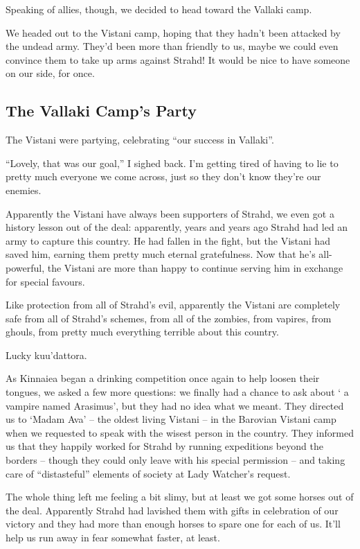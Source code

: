 Speaking of allies, though, we decided to head toward the Vallaki camp.

We headed out to the Vistani camp, hoping that they hadn't been attacked by the undead army. They'd been more than friendly to us, maybe we could even convince them to take up arms against Strahd! It would be nice to have someone on our side, for once.

\subsection*{The Vallaki Camp's Party}
The Vistani were partying, celebrating ``our success in Vallaki''.

``Lovely, that was our goal,'' I sighed back. I'm getting tired of having to lie to pretty much everyone we come across, just so they don't know they're our enemies.

Apparently the Vistani have always been supporters of Strahd, we even got a history lesson out of the deal: apparently, years and years ago Strahd had led an army to capture this country. He had fallen in the fight, but the Vistani had saved him, earning them pretty much eternal gratefulness. Now that he's all-powerful, the Vistani are more than happy to continue serving him in exchange for special favours.

Like protection from all of Strahd's evil, apparently the Vistani are completely safe from all of Strahd's schemes, from all of the zombies, from vapires, from ghouls, from pretty much everything terrible about this country.

Lucky kuu'dattora.

As Kinnaiea began a drinking competition once again to help loosen their tongues, we asked a few more questions: we finally had a chance to ask about ` a vampire named Arasimus', but they had no idea what we meant. They directed us to `Madam Ava' -- the oldest living Vistani -- in the Barovian Vistani camp when we requested to speak with the wisest person in the country. They informed us that they happily worked for Strahd by running expeditions beyond the borders -- though they could only leave with his special permission -- and taking care of ``distasteful'' elements of society at Lady Watcher's request.

The whole thing left me feeling a bit slimy, but at least we got some horses out of the deal. Apparently Strahd had lavished them with gifts in celebration of our victory and they had more than enough horses to spare one for each of us. It'll help us run away in fear somewhat faster, at least.

